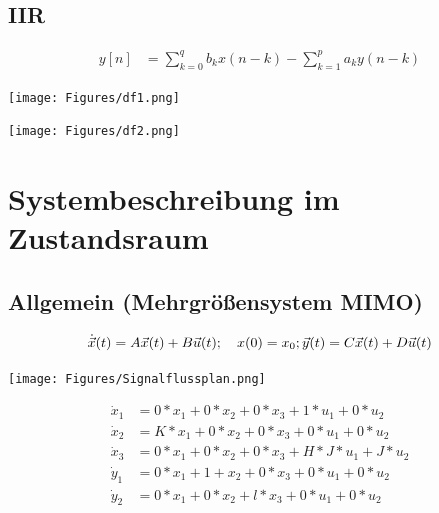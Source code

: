\documentclass[10pt,a4paper]{article}
\begin{document}
  \subsection{IIR}
  \begin{mdframed}[style=exercise]
    \begin{align}
      y[n] &= \sum_{k=0}^{q} b_k x(n-k) - \sum_{k=1}^{p} a_k y(n-k)
    \end{align}
  \end{mdframed}
  \begin{center}
    \texttt{[image: Figures/df1.png]}
  \end{center}
  \begin{center}
    \texttt{[image: Figures/df2.png]}
  \end{center}
  \section{Systembeschreibung im Zustandsraum}
  \subsection{Allgemein (Mehrgrößensystem MIMO) }
  \begin{mdframed}[style=exercise]
    \begin{equation}
      \dot{\Vec{x}}(t) = A\vec{x}(t) + B\vec{u}(t); \quad x(0) = x_{0}; \\*
      \vec{y}(t) = C\vec{x}(t) + D\vec{u}(t)
    \end{equation}
  \end{mdframed}
  \begin{center}
    \texttt{[image: Figures/Signalflussplan.png]}
  \end{center}
  \begin{mdframed}[style=exercise]
    \begin{align*}
      \dot{x}_{1} &= 0*x_{1} +0*x_{2} +0*x_{3} +1*u_{1}+0*u_{2} \\
      \dot{x}_{2} &= K*x_{1} +0*x_{2} +0*x_{3} +0*u_{1}+0*u_{2} \\
      \dot{x}_{3} &= 0*x_{1} +0*x_{2} +0*x_{3} +H*J*u_{1}+J*u_{2} \\
      \dot{y}_{1} &= 0*x_{1} +1+x_{2} +0*x_{3} +0*u_{1}+0*u_{2} \\
      \dot{y}_{2} &= 0*x_{1} +0*x_{2} +l*x_{3} +0*u_{1}+0*u_{2} \\
    \end{align*}
  \end{mdframed}
\end{document}

